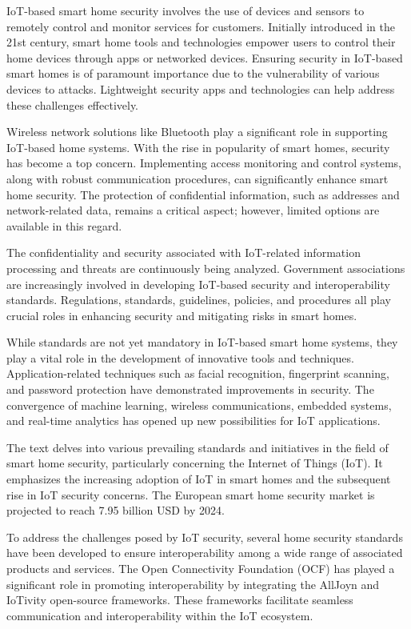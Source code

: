 IoT-based smart home security involves the use of devices and sensors to remotely control and monitor services for customers. Initially introduced in the 21st century, smart home tools and technologies empower users to control their home devices through apps or networked devices. Ensuring security in IoT-based smart homes is of paramount importance due to the vulnerability of various devices to attacks. Lightweight security apps and technologies can help address these challenges effectively.

Wireless network solutions like Bluetooth play a significant role in supporting IoT-based home systems. With the rise in popularity of smart homes, security has become a top concern. Implementing access monitoring and control systems, along with robust communication procedures, can significantly enhance smart home security. The protection of confidential information, such as addresses and network-related data, remains a critical aspect; however, limited options are available in this regard.

The confidentiality and security associated with IoT-related information processing and threats are continuously being analyzed. Government associations are increasingly involved in developing IoT-based security and interoperability standards. Regulations, standards, guidelines, policies, and procedures all play crucial roles in enhancing security and mitigating risks in smart homes.

While standards are not yet mandatory in IoT-based smart home systems, they play a vital role in the development of innovative tools and techniques. Application-related techniques such as facial recognition, fingerprint scanning, and password protection have demonstrated improvements in security. The convergence of machine learning, wireless communications, embedded systems, and real-time analytics has opened up new possibilities for IoT applications.

The text delves into various prevailing standards and initiatives in the field of smart home security, particularly concerning the Internet of Things (IoT). It emphasizes the increasing adoption of IoT in smart homes and the subsequent rise in IoT security concerns. The European smart home security market is projected to reach 7.95 billion USD by 2024.

To address the challenges posed by IoT security, several home security standards have been developed to ensure interoperability among a wide range of associated products and services. The Open Connectivity Foundation (OCF) has played a significant role in promoting interoperability by integrating the AllJoyn and IoTivity open-source frameworks. These frameworks facilitate seamless communication and interoperability within the IoT ecosystem.

